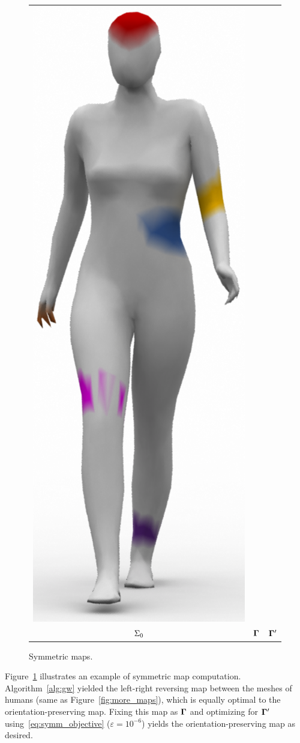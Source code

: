 \begin{figure}
\begin{tabular}{c@{}c@{}c}
\includegraphics[height=.6\linewidth]{figures/symmetry/target_symmetric_humans_cropped.pdf}\\
$\Sigma_0$ & $\mathbf \Gamma$ & $\mathbf \Gamma'$
\end{tabular}
\vspace{-.15in}
\caption{Symmetric maps.}\label{fig:symmetry}
\end{figure}
Figure~\ref{fig:symmetry} illustrates an example of symmetric map computation.  Algorithm~\ref{alg:gw} yielded the left-right reversing map between the meshes of humans (same as Figure~\ref{fig:more_maps}), which is equally optimal to the orientation-preserving map.  Fixing this map as $\mathbf \Gamma$ and optimizing for $\mathbf \Gamma'$ using~\eqref{eq:symm_objective} ($\varepsilon\!=\!10^{-6}$) yields the orientation-preserving map as desired.

